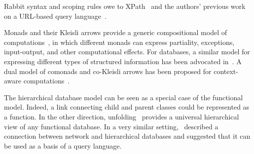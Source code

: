 Rabbit syntax and scoping rules owe to XPath~\cite{Clark1999} and the authors'
previous work on a URL-based query language~\cite{Evans2007}.

Monads and their Kleisli arrows provide a generic compositional model of
computations~\cite{Moggi1991}, in which different monads can express
partiality, exceptions, input-output, and other computational effects.  For
databases, a similar model for expressing different types of structured
information has been advocated in~\cite{Spivak2012}.  A dual model of comonads
and co-Kleisli arrows has been proposed for context-aware
computations~\cite{Uustalu2005}.

The hierarchical database model can be seen as a special case of the functional
model.  Indeed, a link connecting child and parent classes could be represented
as a function.  In the other direction, unfolding~\cite{Nielsen1993} provides a
universal hierarchical view of any functional database.  In a very similar
setting, \cite{Cartmell1985}~described a connection between network and
hierarchical databases and suggested that it can be used as a basis of a query
language.

